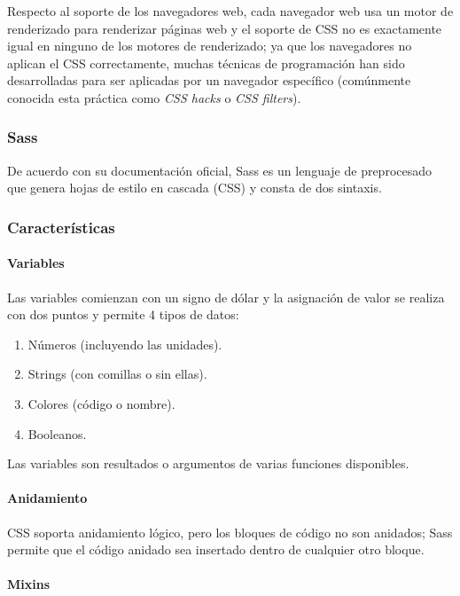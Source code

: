Respecto al soporte de los navegadores web, cada navegador web usa un motor de renderizado para renderizar páginas web y el soporte de CSS no es exactamente igual en ninguno de los motores de renderizado; ya que los navegadores no aplican el CSS correctamente, muchas técnicas de programación han sido desarrolladas para ser aplicadas por un navegador específico (comúnmente conocida esta práctica como \textit{CSS hacks} o \textit{CSS filters}).


\subsubsection*{Sass}

De acuerdo con su documentación oficial\cite{noauthor_documentation_nodate}, Sass es un lenguaje de preprocesado que genera hojas de estilo en cascada (CSS) y consta de dos sintaxis.

\subsubsection*{Características}

\paragraph*{Variables}
Las variables comienzan con un signo de dólar y la asignación de valor se realiza con dos puntos y permite 4 tipos de datos:

\begin{enumerate}
    \item Números (incluyendo las unidades).
    \item Strings (con comillas o sin ellas).
    \item Colores (código o nombre).
    \item Booleanos.
\end{enumerate}
Las variables son resultados o argumentos de varias funciones disponibles.

\paragraph*{Anidamiento}
CSS soporta anidamiento lógico, pero los bloques de código no son anidados; Sass permite que el código anidado sea insertado dentro de cualquier otro bloque.


\paragraph*{Mixins}

